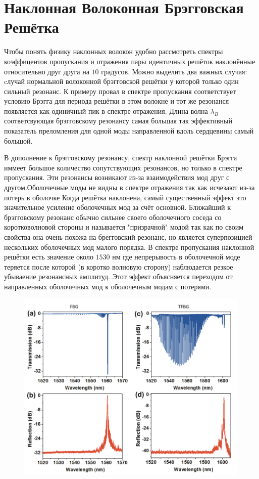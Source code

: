 \section{Наклонная Волоконная Брэгговская Решётка}
Чтобы понять физику наклонных волокон удобно рассмотреть спектры коэффицентов 
пропускания и отражения пары идентичных решёток наклонённые относительно друг друга на $ 10 $ градусов.
Можно выделить два важных случая: cлучай нормальной волоконной брэгговской решётки у которой только один сильный резонанс. К примеру провал в спектре пропускания соответствует условию Брэгга для периода решётки в этом волокне и тот же резонанся появляется как одиничный пик в спектре отражения. Длина волна $ \lambda_{B} $ соответсвующая брэгговскому резонансу самая большая так эффективный показатель преломления для одной моды направленной вдоль сердцевины самый большой.

В дополнение к брэгговскому резонансу, спектр наклонной решётки Брэгга иммеет большое количество сопутствующих резонансов, но только в спектре пропускания. Эти резонансы возникают из-за взаимодействия мод друг с другом.Оболочечные моды не видны в спектре отражения так как исчезают из-за потерь в оболочке Когда решётка наклонена, самый существенный эффект это значительное усиление оболочечных мод за счёт основной.
Ближайший к брэгговскому резонанс обычно сильнее своего оболочечного соседа со коротковолновой стороны и называется "призрачной" модой так как по своим свойства она очень похожа на брегговский резонанс, но
является суперпозицией нескольких оболочечных мод малого порядка. В спектре пропускания наклонной решётки есть значение около $ 1530 $ нм где непрерывость в оболочечной моде теряется после которой (в коротко
волновую сторону) наблюдается резкое убываение резонансных амплитуд. Этот эффект объясняется переходом от направленных оболочечных мод к оболочечным модам с потерями.







\begin{figure}[h]
	\centering
	\includegraphics[width=0.7\linewidth]{screenshot001}
	\caption{}
	\label{fig:screenshot001}
\end{figure}


